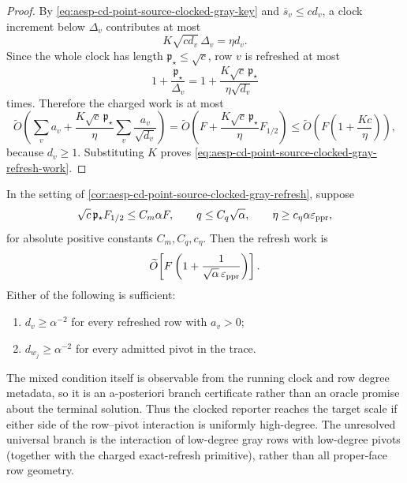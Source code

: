 \begin{proof}
By
\cref{eq:aesp-cd-point-source-clocked-gray-key} and
\(\overline s_v\leq cd_v\), a clock increment below \(\Delta_v\) contributes
at most
\begin{equation*}
 K\sqrt{cd_v}\,\Delta_v=\eta d_v.
\end{equation*}
Since the whole clock has length \(\mathfrak p_\star\leq\sqrt c\), row \(v\)
is refreshed
at most
\begin{equation*}
 1+\frac{\mathfrak p_\star}{\Delta_v}
 =1+\frac{K\sqrt c\,\mathfrak p_\star}{\eta\sqrt{d_v}}
\end{equation*}
times.  Therefore the charged work is at most
\begin{equation*}
 \widetilde O\!\left(
 \sum_va_v+
 \frac{K\sqrt c\,\mathfrak p_\star}{\eta}
 \sum_v\frac{a_v}{\sqrt{d_v}}
 \right)
 =
 \widetilde O\!\left(
 F+\frac{K\sqrt c\,\mathfrak p_\star}{\eta}F_{1/2}
 \right)
 \leq
 \widetilde O\!\left(F\left(1+\frac{Kc}{\eta}\right)\right),
\end{equation*}
because \(d_v\geq1\).  Substituting \(K\) proves
\cref{eq:aesp-cd-point-source-clocked-gray-refresh-work}.
\end{proof}

\begin{corollary}
\label{cor:aesp-cd-point-source-high-degree-gray-refresh}
In the setting of
\cref{cor:aesp-cd-point-source-clocked-gray-refresh}, suppose
\begin{equation*}
 \sqrt c\,\mathfrak p_\star F_{1/2}\leq C_m\alpha F,
 \qquad
 q\leq C_q\sqrt\alpha,
 \qquad
 \eta\geq c_\eta\alpha\varepsilon_{\rm ppr},
\end{equation*}
for absolute positive constants \(C_m,C_q,c_\eta\).  Then the refresh work is
\begin{equation}
 \widetilde O\!\left[
 F\left(1+\frac{1}{\sqrt\alpha\,\varepsilon_{\rm ppr}}\right)
 \right].
 \label{eq:aesp-cd-point-source-high-degree-gray-refresh}
\end{equation}
Either of the following is sufficient:
\begin{enumerate}[label=(\alph*)]
 \item \(d_v\geq\alpha^{-2}\) for every refreshed row with \(a_v>0\);
 \item \(d_{w_j}\geq\alpha^{-2}\) for every admitted pivot in the trace.
\end{enumerate}
The mixed condition itself is observable from the running clock and row
degree metadata, so it is an a-posteriori branch certificate rather than an
oracle promise about the terminal solution.
Thus the clocked reporter reaches the target scale if either side of the
row--pivot interaction is uniformly high-degree.  The unresolved universal
branch is the interaction of low-degree gray rows with low-degree pivots
(together with the charged exact-refresh primitive), rather than all
proper-face row geometry.
\end{corollary}


